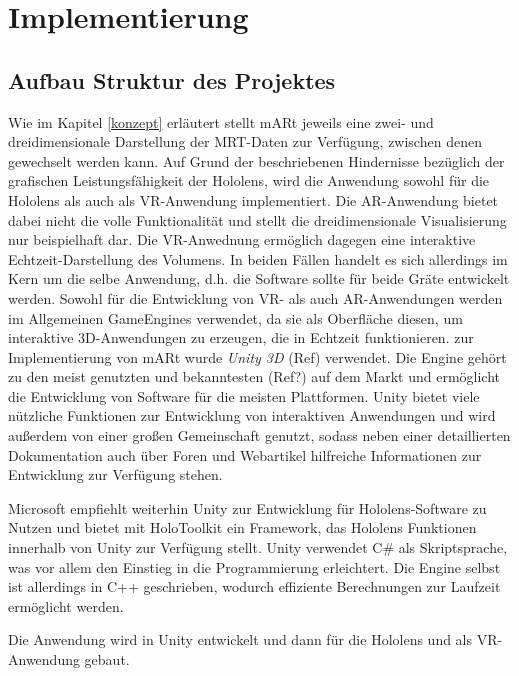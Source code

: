 
\chapter{Implementierung}
\label{implementierung}

\section{Aufbau Struktur des Projektes}

Wie im Kapitel \ref{konzept} erläutert stellt mARt jeweils eine zwei- und dreidimensionale Darstellung der MRT-Daten zur Verfügung, zwischen denen gewechselt werden kann. Auf Grund der beschriebenen Hindernisse bezüglich der grafischen Leistungsfähigkeit der Hololens, wird die Anwendung sowohl für die Hololens als auch als VR-Anwendung implementiert. Die AR-Anwendung bietet dabei nicht die volle Funktionalität und stellt die dreidimensionale Visualisierung nur beispielhaft dar. Die VR-Anwednung ermöglich dagegen eine interaktive Echtzeit-Darstellung des Volumens. In beiden Fällen handelt es sich allerdings im Kern um die selbe Anwendung, d.h. die Software sollte für beide Gräte entwickelt werden. 
Sowohl für die Entwicklung von VR- als auch AR-Anwendungen werden im Allgemeinen GameEngines verwendet, da sie als Oberfläche diesen, um interaktive 3D-Anwendungen zu erzeugen, die in Echtzeit funktionieren. 
zur Implementierung von mARt wurde \textit{Unity 3D} (Ref) verwendet. Die Engine gehört zu den meist genutzten und bekanntesten (Ref?) auf dem Markt und ermöglicht die Entwicklung von Software für die meisten Plattformen. Unity bietet viele nützliche Funktionen zur Entwicklung von interaktiven Anwendungen und wird außerdem von einer großen  Gemeinschaft genutzt, sodass neben einer detaillierten Dokumentation auch über Foren und Webartikel hilfreiche Informationen zur Entwicklung zur Verfügung stehen.

Microsoft empfiehlt weiterhin Unity zur Entwicklung für Hololens-Software zu Nutzen und bietet mit HoloToolkit ein Framework, das Hololens Funktionen innerhalb von Unity zur Verfügung stellt. 
Unity verwendet C\# als Skriptsprache, was vor allem den Einstieg in die Programmierung erleichtert. Die Engine selbst ist allerdings in C++ geschrieben, wodurch effiziente Berechnungen zur Laufzeit ermöglicht werden.

Die Anwendung wird in Unity entwickelt und dann für die Hololens und als VR-Anwendung gebaut.


